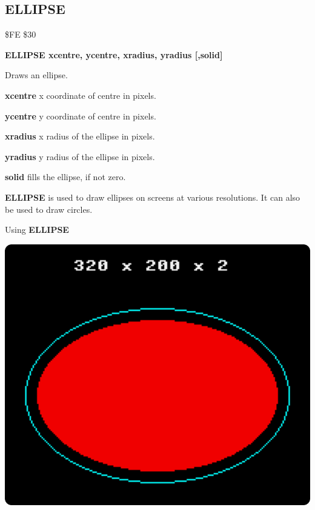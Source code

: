 \subsection{ELLIPSE}
\begin{description}[leftmargin=2cm,style=nextline]
\item [Token:] \$FE \$30
\item [Format:] {\bf ELLIPSE xcentre, ycentre, xradius, yradius [,solid]}
\item [Usage:] Draws an ellipse.

               {\bf xcentre} x coordinate of centre in pixels.

               {\bf ycentre} y coordinate of centre in pixels.

               {\bf xradius} x radius of the ellipse in pixels.

               {\bf yradius} y radius of the ellipse in pixels.

               {\bf solid} fills the ellipse, if not zero.

\item [Remarks:] {\bf ELLIPSE} is used to draw ellipses on
               screens at various resolutions.
               It can also be used to draw circles.

\item [Example:] Using {\bf ELLIPSE}


\item \begin{center}\includegraphics[width=0.7\linewidth]{images/ellipse.png}\end{center}


\end{description}
